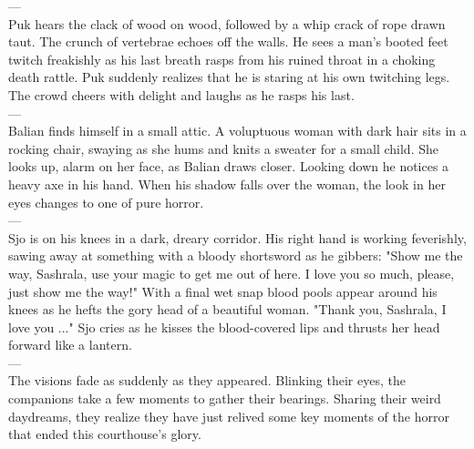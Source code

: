 ---\\

Puk hears the clack of wood on wood, followed by a whip crack of rope drawn taut. The crunch of vertebrae echoes off the walls. He sees a man's booted feet twitch freakishly as his last breath rasps from his ruined throat in a choking death rattle. Puk suddenly realizes that he is staring at his own twitching legs. The crowd cheers with delight and laughs as he rasps his last.\\

---\\

Balian finds himself in a small attic. A voluptuous woman with dark hair sits in a rocking chair, swaying as she hums and knits a sweater for a small child. She looks up, alarm on her face, as Balian draws closer. Looking down he notices a heavy axe in his hand. When his shadow falls over the woman, the look in her eyes changes to one of pure horror.\\

---\\

Sjo is on his knees in a dark, dreary corridor. His right hand is working feverishly, sawing away at something with a bloody shortsword as he gibbers: "Show me the way, Sashrala, use your magic to get me out of here. I love you so much, please, just show me the way!" With a final wet snap blood pools appear around his knees as he hefts the gory head of a beautiful woman. "Thank you, Sashrala, I love you ..." Sjo cries as he kisses the blood-covered lips and thrusts her head forward like a lantern.\\

---\\

The visions fade as suddenly as they appeared. Blinking their eyes, the companions take a few moments to gather their bearings. Sharing their weird daydreams, they realize they have just relived some key moments of the horror that ended this courthouse's glory.\\

